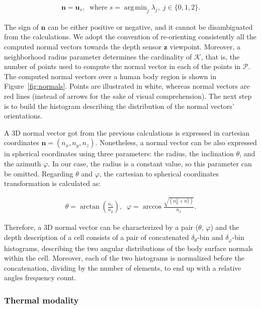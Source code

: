 \documentclass[10pt,twocolumn,letterpaper]{article}
\DeclareMathOperator*{\argmin}{arg\,min}
\begin{document}
\begin{gather}
	\mathbf{n} = \mathbf{u}_s, \;\; \mathrm{where}\;  s = \argmin_{j}{\lambda_j},\; j \in \{0,1,2\}.
\end{gather}

The sign of $\mathbf{n}$ can be either positive or negative, and it cannot be disambiguated from the calculations. We adopt the convention of re-orienting consistently all the computed normal vectors towards the depth sensor $\mathbf{z}$ viewpoint. Moreover, a neighborhood radius parameter determines the cardinality of $\mathcal{K}$, that is, the number of points used to compute the normal vector in each of the points in $\mathcal{P}$. The computed normal vectors over a human body region is shown in Figure~\ref{fig:normals}. Points are illustrated in white, whereas normal vectors are red lines (instead of arrows for the sake of visual comprehension). The next step is to build the histogram describing the distribution of the normal vectors' orientations.

A 3D normal vector got from the previous calculations is expressed in cartesian coordinates $\mathbf{n} = (n_x, n_y, n_z)$. Nonetheless, a normal vector can be also expressed in spherical coordinates using three parameters: the radius, the inclination $\theta$, and the azimuth $\varphi$. In our case, the radius is a constant value, so this parameter can be omitted. Regarding $\theta$ and $\varphi$, the cartesian to spherical coordinates transformation is calculated as:

\begin{gather}	
	\theta  = \arctan{\left( \frac{n_z}{n_y} \right)},\;\;
	\varphi = \arccos{\frac{ \sqrt{(n_y^2 + n_z^2)} }{n_x}}.
\end{gather}

Therefore, a 3D normal vector can be characterized by a pair ($\theta$, $\varphi$) and the depth description of a cell consists of a pair of concatenated $\delta_\theta$-bin and $\delta_\varphi$-bin histograms, describing the two angular distributions of the body surface normals within the cell. Moreover, each of the two histograms is normalized before the concatenation, dividing by the number of elements, to end up with a relative angles frequency count.

\subsubsection{Thermal modality}
\label{sssec:thermal}
\end{document}
